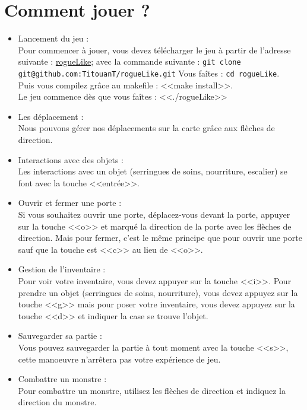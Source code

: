 \documentclass[11pt]{report}
\begin{document}
	\section{Comment jouer ?}
		\begin{itemize}
			\item{Lancement du jeu : \\}
				Pour commencer à jouer, vous devez télécharger le jeu à partir de l'adresse suivante : \href{https://github.com/TitouanT/rogueLike/} {rogueLike}; avec la commande suivante : \texttt{git clone git@github.com:TitouanT/rogueLike.git}
				Vous faîtes : \texttt{cd rogueLike}. \\
				Puis vous compilez grâce au makefile : <<make install>>. \\
				Le jeu commence dès que vous faîtes : <<./rogueLike>>		
			\item{Les déplacement : \\}
				Nous pouvons gérer nos déplacements sur la carte grâce aux flèches de direction. 
			\item{Interactions avec des objets : \\}	
				Les interactions avec un objet (serringues de soins, nourriture, escalier) se font avec la touche <<entrée>>.
			\item{Ouvrir et fermer une porte :\\}	
				Si vous souhaitez ouvrir une porte, déplacez-vous devant la porte, appuyer sur la touche <<o>> et marqué la direction de la porte avec les flèches de direction.
				Mais pour fermer, c'est le même principe que pour ouvrir une porte sauf que la touche est <<c>> au lieu de <<o>>.
			\item{Gestion de l'inventaire : \\}
				Pour voir votre inventaire, vous devez appuyer sur la touche <<i>>. Pour prendre un objet (serringues de soins, nourriture), vous devez appuyez sur la touche <<g>> mais pour poser votre inventaire, vous devez appuyez sur la touche <<d>> et indiquer la case se trouve l'objet.
			\item{Sauvegarder sa partie :\\}
				Vous pouvez sauvegarder la partie à tout moment avec la touche <<s>>, cette manoeuvre n'arrêtera pas votre expérience de jeu.
			\item{Combattre un monstre :\\}
				Pour combattre un monstre, utilisez les flèches de direction et indiquez la direction du monstre.		
		\end{itemize}
		
\end{document}
